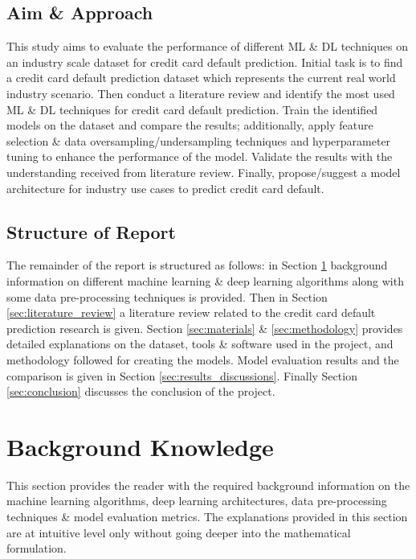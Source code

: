 \documentclass[twoside,11pt,a4paper]{article}
\begin{document}
\subsection{Aim \& Approach}

This study aims to evaluate the performance of different \acf{ML} \&  \acf{DL} techniques on an industry scale dataset for credit card default prediction. Initial task is to find a credit card default prediction dataset which represents the current real world industry scenario. Then conduct a literature review and identify the most used \acs{ML} \& \acs{DL} techniques for credit card default prediction. Train the identified models on the dataset and compare the results; additionally, apply feature selection \& data oversampling/undersampling techniques and hyperparameter tuning to enhance the performance of the model. Validate the results with the understanding received from literature review. Finally, propose/suggest a model architecture for industry use cases to predict credit card default.

\subsection{Structure of Report}
The remainder of the report is structured as follows: in Section \ref{sec:background_knowledge} background information on different machine learning \& deep learning algorithms along with some data pre-processing techniques is provided. Then in Section \ref{sec:literature_review} a literature review related to the credit card default prediction research is given. Section \ref{sec:materials} \& \ref{sec:methodology} provides detailed explanations on the dataset, tools \& software used in the project, and methodology followed for creating the models. Model evaluation results and the comparison is given in Section \ref{sec:results_discussions}. Finally Section \ref{sec:conclusion} discusses the conclusion of the project. 
\vfill
\clearpage
\section{Background Knowledge} \label{sec:background_knowledge}
This section provides the reader with the required background information on the machine learning algorithms, deep learning architectures, data pre-processing techniques \& model evaluation metrics. The explanations provided in this section are at intuitive level only without going deeper into the mathematical formulation.
\end{document}
